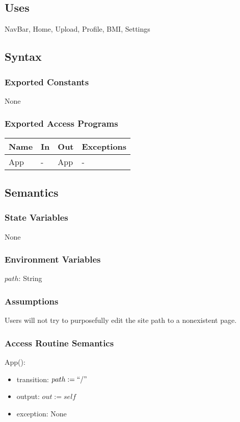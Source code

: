 \documentclass[12pt, titlepage]{article}
\begin{document}
\subsection{Uses}
NavBar, Home, Upload, Profile, BMI, Settings
\subsection{Syntax}
\subsubsection{Exported Constants}
None
\subsubsection{Exported Access Programs}
\begin{center}
	\begin{tabular}{p{3cm} p{4cm} p{4cm} p{3cm}}
		
		\hline
		\textbf{Name} & \textbf{In} & \textbf{Out} & \textbf{Exceptions} \\
		\hline
		App & - & App & - \\
		\hline
	\end{tabular}
\end{center}
\subsection{Semantics}
\subsubsection{State Variables}
None
\subsubsection{Environment Variables}
$path$: String
\subsubsection{Assumptions}
Users will not try to purposefully edit the site path to a nonexistent page.
\subsubsection{Access Routine Semantics}
App():
\begin{itemize}
	\item transition: $path := ``/"$
	\item output: $out := self$
	\item exception: None
\end{itemize}
\end{document}
